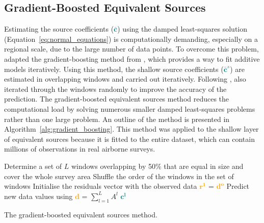 \subsection{Gradient-Boosted Equivalent Sources}

Estimating the source coefficients (\textcolor{teal}{$\bar{\mathbf{c}}$}) using the damped least-squares solution (Equation~\ref{eq:normal_equations}) is computationally demanding, especially on a regional scale, due to the large number of data points. 
To overcome this problem, \citet{Soler2021} adapted the gradient-boosting method from \citet{Friedman2001}, which provides a way to fit additive models iteratively. Using this method, the shallow source coefficients (\textcolor{teal}{$\bar{\mathbf{c}}^s$}) are estimated in overlapping windows and carried out iteratively. Following \citet{Friedman2002}, \citet{Soler2021} also iterated through the windows randomly to improve the accuracy of the prediction. 
The gradient-boosted equivalent sources method reduces the computational load by solving numerous smaller damped least-squares problems rather than one large problem.
An outline of the method is presented in Algorithm~\ref{alg:gradient_boosting}.
This method was applied to the shallow layer of equivalent sources because it is fitted to the entire dataset, which can contain millions of observations in real airborne surveys.

\begin{algorithm}[!h]
    Determine a set of $L$ windows overlapping by 50\% that are equal in size and cover the whole survey area
    \;
    Shuffle the order of the windows in the set of windows
    \;
    Initialise the residuals vector with the observed data \textcolor{orange}{$\mathbf{r^1}$} = \textcolor{orange}{$\mathbf{d^o}$}
    \;
    Predict new data values using \textcolor{orange}{$\mathbf{d}$} = $\sum\limits_{l=1}^{L} A^l$ \textcolor{teal}{$\mathbf{c^l}$}
    \;
    \BlankLine
    \caption{The gradient-boosted equivalent sources method.}
    \label{alg:gradient_boosting}
\end{algorithm}

